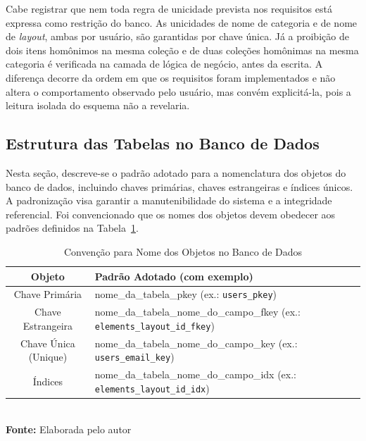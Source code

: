 Cabe registrar que nem toda regra de unicidade prevista nos requisitos está expressa como restrição do banco. As unicidades de nome de categoria e de nome de \textit{layout}, ambas por usuário, são garantidas por chave única. Já a proibição de dois itens homônimos na mesma coleção e de duas coleções homônimas na mesma categoria é verificada na camada de lógica de negócio, antes da escrita. A diferença decorre da ordem em que os requisitos foram implementados e não altera o comportamento observado pelo usuário, mas convém explicitá-la, pois a leitura isolada do esquema não a revelaria.

\subsection{Estrutura das Tabelas no Banco de Dados}
\label{sec:estrutura_tabelas}

Nesta seção, descreve-se o padrão adotado para a nomenclatura dos objetos do banco de dados, incluindo chaves primárias, chaves estrangeiras e índices únicos. A padronização visa garantir a manutenibilidade do sistema e a integridade referencial. Foi convencionado que os nomes dos objetos devem obedecer aos padrões definidos na Tabela~\ref{tab:convencaoObjBD}.

\FloatBarrier
\begin{table}[!htbp]
\centering
\caption{Convenção para Nome dos Objetos no Banco de Dados}
    \begin{tabularx}{\textwidth}{ | c | X | }
        \hline
        \textbf{Objeto} & \textbf{Padrão Adotado (com exemplo)} \\ \hline
        Chave Primária & nome\_da\_tabela\_pkey (ex.: \texttt{users\_pkey}) \\ \hline
        Chave Estrangeira & nome\_da\_tabela\_nome\_do\_campo\_fkey (ex.: \texttt{elements\_layout\_id\_fkey}) \\ \hline
        Chave Única (Unique) & nome\_da\_tabela\_nome\_do\_campo\_key (ex.: \texttt{users\_email\_key}) \\ \hline
        Índices & nome\_da\_tabela\_nome\_do\_campo\_idx (ex.: \texttt{elements\_layout\_id\_idx}) \\ \hline
    \end{tabularx}
    \\ \vspace{0.2cm}
    \textbf{Fonte:} Elaborada pelo autor
    \label{tab:convencaoObjBD}
\end{table}
\FloatBarrier

